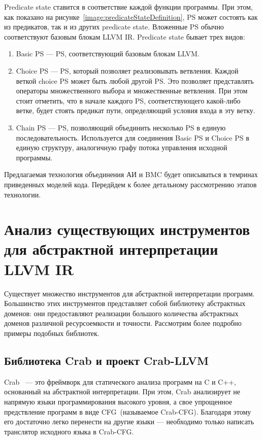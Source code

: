 Predicate state ставится в соответствие каждой функции программы. При этом, 
как показано на рисунке~\ref{image:predicateStateDefinition}, PS может 
состоять как из предикатов, так и из других predicate state. Вложенные PS 
обычно соответствуют базовым блокам LLVM IR. Predicate state бывает трех видов:
\begin{enumerate}
\item Basic PS --- PS, соответствующий базовым блокам LLVM.
\item Choice PS --- PS, который позволяет реализовывать ветвления. Каждой 
веткой choice PS может быть любой другой PS. Это позволяет представлять 
операторы множественного выбора и множественные ветвления. При этом стоит 
отметить, что в начале каждого PS, соответствующего какой-либо ветке, будет 
стоять предикат пути, определяющий условия входа в эту ветку.
\item Chain PS --- PS, позволяющий объединить несколько PS в единую 
последовательность. Используется для соединения Basic PS и Choice PS в единую 
структуру, аналогичную графу потока управления исходной программы.
\end{enumerate}

Предлагаемая технология объединения АИ и BMC будет описываться в темринах 
приведенных моделей кода. Передйдем к более детальному рассмотрению этапов
технологии.

\section{Анализ существующих инструментов для абстрактной интерпретации 
LLVM IR}
Существует множество инструментов для абстрактной интерпретации программ. 
Большинство этих инструментов представляет собой библиотеку абстрактных 
доменов: они предоставляют реализации большого количества абстрактных доменов
различной ресурсоемкости и точности. Рассмотрим более подробно примеры подобных
библиотек.

\subsection{Библиотека Crab и проект Crab-LLVM}
Crab~\cite{crab} --- это фреймворк для статического анализа программ на C и 
C++, основанный на абстрактной интерпретации. При этом, Crab анализирует не
напрямую языки программирования высокого уровня, а свое упрощенное предствление
программ в виде CFG~(называемое Crab-CFG). Благодаря этому его достаточно 
легко перенести на другие языки --- необходимо только написать транслятор исходного языка в Crab-CFG.

